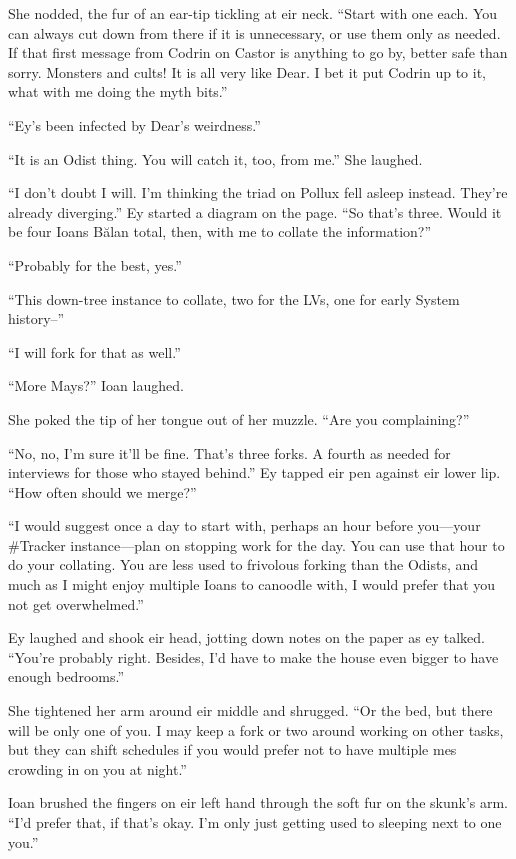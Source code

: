 She nodded, the fur of an ear-tip tickling at eir neck. ``Start with one each. You can always cut down from there if it is unnecessary, or use them only as needed. If that first message from Codrin on Castor is anything to go by, better safe than sorry. Monsters and cults! It is all very like Dear. I bet it put Codrin up to it, what with me doing the myth bits.''

``Ey's been infected by Dear's weirdness.''

``It is an Odist thing. You will catch it, too, from me.'' She laughed.

``I don't doubt I will. I'm thinking the triad on Pollux fell asleep instead. They're already diverging.'' Ey started a diagram on the page. ``So that's three. Would it be four Ioans Bălan total, then, with me to collate the information?''

``Probably for the best, yes.''

``This down-tree instance to collate, two for the LVs, one for early System history--''

``I will fork for that as well.''

``More Mays?'' Ioan laughed.

She poked the tip of her tongue out of her muzzle. ``Are you complaining?''

``No, no, I'm sure it'll be fine. That's three forks. A fourth as needed for interviews for those who stayed behind.'' Ey tapped eir pen against eir lower lip. ``How often should we merge?''

``I would suggest once a day to start with, perhaps an hour before you---your \#Tracker instance---plan on stopping work for the day. You can use that hour to do your collating. You are less used to frivolous forking than the Odists, and much as I might enjoy multiple Ioans to canoodle with, I would prefer that you not get overwhelmed.''

Ey laughed and shook eir head, jotting down notes on the paper as ey talked. ``You're probably right. Besides, I'd have to make the house even bigger to have enough bedrooms.''

She tightened her arm around eir middle and shrugged. ``Or the bed, but there will be only one of you. I may keep a fork or two around working on other tasks, but they can shift schedules if you would prefer not to have multiple mes crowding in on you at night.''

Ioan brushed the fingers on eir left hand through the soft fur on the skunk's arm. ``I'd prefer that, if that's okay. I'm only just getting used to sleeping next to one you.''

